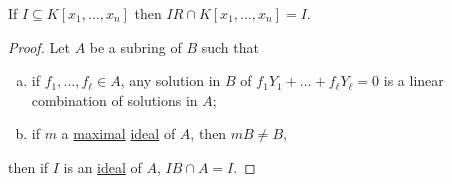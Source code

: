 \begin{theorem}\label{thm:lec27}
	If \(I \subseteq K[x_1, \dots , x_n]\) then \(IR \cap K[x_1, \dots , x_n] = I\).
\end{theorem}
\begin{proof}
	Let \(A\) be a subring of \(B\) such that
	\begin{enumerate}[(a)]
		\item if \(f_1, \dots , f_{\ell }\in A \), any solution in \(B\) of \(f_1 Y_1 + \dots + f_{\ell }Y_{\ell } = 0\) is a linear combination of solutions in \(A\);
		\item if \(m\) a \hyperref[def:proper-ideal-maximal]{maximal} \hyperref[def:ideal]{ideal} of \(A\), then \(mB \neq B\),
	\end{enumerate}
	then if \(I\) is an \hyperref[def:ideal]{ideal} of \(A\), \(I B \cap A = I\).
\end{proof}

